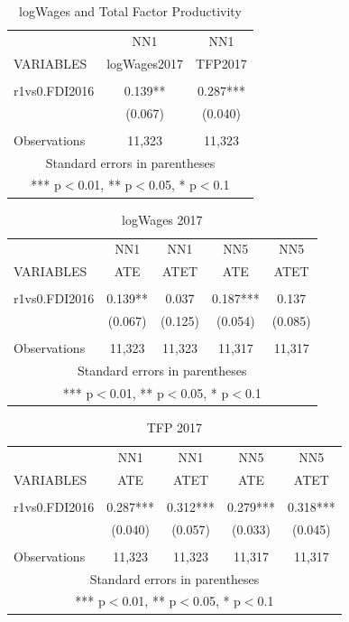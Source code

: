 \documentclass[a4paper,11pt]{scrartcl}
\begin{document}
\begin{table}[htbp]\centering
\caption{logWages and Total Factor Productivity}
\begin{tabular}{lcc} \hline
 &NN1 & NN1\\
VARIABLES & logWages2017 & TFP2017 \\ \hline
 &  &  \\
r1vs0.FDI2016 & 0.139** & 0.287*** \\
 & (0.067) & (0.040) \\
 &  &  \\
 Observations & 11,323 & 11,323 \\ \hline
\multicolumn{3}{c}{ Standard errors in parentheses} \\
\multicolumn{3}{c}{ *** p$<$0.01, ** p$<$0.05, * p$<$0.1} \\
\end{tabular}
\end{table}


\begin{table}[htbp]\centering
\caption{logWages 2017}
\begin{tabular}{lcccc} \hline
 & NN1 & NN1 & NN5 & NN5 \\
VARIABLES & ATE & ATET & ATE & ATET\\ \hline
 &  &  &  &  \\
r1vs0.FDI2016 & 0.139** & 0.037 & 0.187*** & 0.137 \\
 & (0.067) & (0.125) & (0.054) & (0.085) \\
 &  &  &  &  \\
 Observations & 11,323 & 11,323 & 11,317 & 11,317 \\ \hline
\multicolumn{5}{c}{ Standard errors in parentheses} \\
\multicolumn{5}{c}{ *** p$<$0.01, ** p$<$0.05, * p$<$0.1} \\
\end{tabular}
\end{table}

\begin{table}[htbp]\centering
\caption{TFP 2017}
\begin{tabular}{lcccc} \hline
 & NN1 & NN1 & NN5 & NN5 \\
VARIABLES & ATE & ATET & ATE & ATET \\ \hline
 &  &  &  &  \\
r1vs0.FDI2016 & 0.287*** & 0.312*** & 0.279*** & 0.318*** \\
 & (0.040) & (0.057) & (0.033) & (0.045) \\
 &  &  &  &  \\
 Observations & 11,323 & 11,323 & 11,317 & 11,317 \\ \hline
\multicolumn{5}{c}{ Standard errors in parentheses} \\
\multicolumn{5}{c}{ *** p$<$0.01, ** p$<$0.05, * p$<$0.1} \\
\end{tabular}
\end{table}
\end{document}
